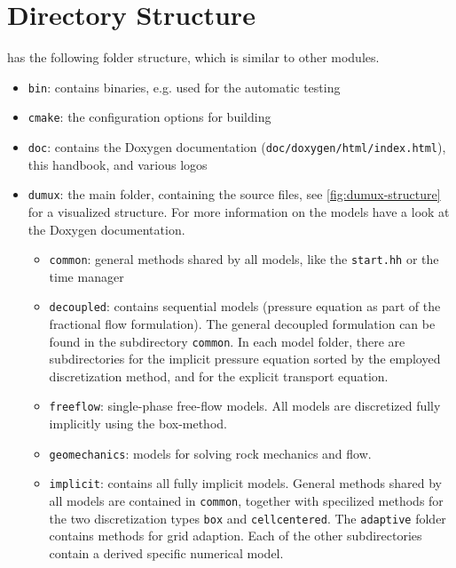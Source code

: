 \section{Directory Structure}
\label{sc_structure}

\Dumux has the following folder structure, which is similar to other \Dune modules.
\begin{itemize}
\item \texttt{bin}: contains binaries, e.g. used for the automatic testing
\item \texttt{cmake}: the configuration options for building \Dumux
\item \texttt{doc}: contains the Doxygen documentation (\texttt{doc/doxygen/html/index.html}),
                    this handbook, and various logos
\item \texttt{dumux}: the main folder, containing the source files, see \ref{fig:dumux-structure}
      for a visualized structure. For more information on the models have a look at the
      Doxygen documentation.
  \begin{itemize}
  \item \texttt{common}: general methods shared by all models, 
         like the \texttt{start.hh} or the time manager

  \item \texttt{decoupled}: contains sequential models (pressure equation as part of
         the fractional flow formulation). The general decoupled formulation can be found in
         the subdirectory \texttt{common}. In each model folder, there are subdirectories
         for the implicit pressure equation sorted by the employed discretization method,
         and for the explicit transport equation.

  \item \texttt{freeflow}: single-phase free-flow models. All models are discretized
         fully implicitly using the box-method.

  \item \texttt{geomechanics}: models for solving rock mechanics and flow.

  \item \texttt{implicit}: contains all fully implicit models. General methods shared
         by all models are contained in \texttt{common}, together with specilized methods
         for the two discretization types \texttt{box} and \texttt{cellcentered}. The
         \texttt{adaptive} folder contains methods for grid adaption. Each of the other
         subdirectories contain a derived specific numerical model.


\end{itemize}
\end{itemize}
